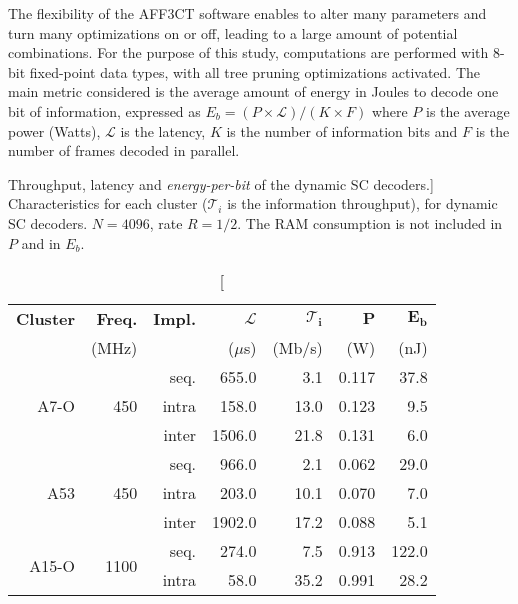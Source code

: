 The flexibility of the AFF3CT software enables to alter many parameters and turn
many optimizations on or off, leading to a large amount of potential
combinations. For the purpose of this study, computations are performed with
8-bit fixed-point data types, with all tree pruning optimizations activated. The
main metric considered is the average amount of energy in Joules to decode one
bit of information, expressed  as  $E_b = (P \times \mathcal{L}) / (K \times F)$
where $P$ is the average power (Watts), $\mathcal{L}$ is the latency, $K$ is the
number of information bits and $F$ is the number of frames decoded in parallel.

\begin{table}[htp]
  \centering
  \caption
    [Throughput, latency and \emph{energy-per-bit} of the dynamic SC decoders.]
    {Characteristics for each cluster ($\mathcal{T}_i$ is the information
    throughput), for dynamic SC decoders. $N = 4096$, rate $R = 1/2$. The RAM
    consumption is not included in $P$ and in $E_b$.}
  \label{tab:eval_polar_energy_results}
  \begin{tabular}{r r r r r r r}
    \textbf{Cluster} & \textbf{Freq.} & \textbf{Impl.} & $\bm{\mathcal{L}}$ & $\bm{\mathcal{T}_i}$ & $\bm{P}$ & $\boldsymbol{E_b}$ \\
                     &          (MHz) &                &          ($\mu$s)  &               (Mb/s) &      (W) &               (nJ) \\
    \hline
    \hline
    \multirow{3}{*}{A7-O}      & \multirow{3}{*}{ 450} & seq.  &  655.0 &   3.1 & 0.117 &  37.8 \\
                               &                       & intra &  158.0 &  13.0 & 0.123 &   9.5 \\
                               &                       & inter & 1506.0 &  21.8 & 0.131 &   6.0 \\
    \hline
    \multirow{3}{*}{A53}       & \multirow{3}{*}{ 450} & seq.  &  966.0 &   2.1 & 0.062 &  29.0 \\
                               &                       & intra &  203.0 &  10.1 & 0.070 &   7.0 \\
                               &                       & inter & 1902.0 &  17.2 & 0.088 &   5.1 \\
    \hline
    \multirow{3}{*}{A15-O}     & \multirow{3}{*}{1100} & seq.  &  274.0 &   7.5 & 0.913 & 122.0 \\
                               &                       & intra &   58.0 &  35.2 & 0.991 &  28.2 \\

\end{tabular}
\end{table}
